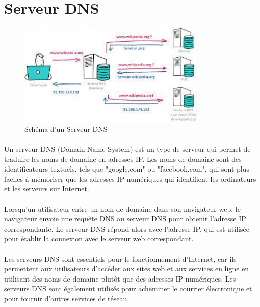  \section{Serveur DNS}
	\begin{figure}[h]
		\begin{center}
			
		
	\includegraphics[width=0.8\textwidth]{PhotoMemoire/serveur_dns.jpeg}
	\caption{Schéma d'un Serveur DNS}
\end{center}
\end{figure}
\paragraph{ }
Un serveur DNS (Domain Name System) est un type de serveur qui permet de traduire les noms de domaine en adresses IP. Les noms de domaine sont des identificateurs textuels, tels que "google.com" ou "facebook.com", qui sont plus faciles à mémoriser que les adresses IP numériques qui identifient les ordinateurs et les serveurs sur Internet.
\paragraph{ }
Lorsqu'un utilisateur entre un nom de domaine dans son navigateur web, le navigateur envoie une requête DNS au serveur DNS pour obtenir l'adresse IP correspondante. Le serveur DNS répond alors avec l'adresse IP, qui est utilisée pour établir la connexion avec le serveur web correspondant.
\paragraph{ }
Les serveurs DNS sont essentiels pour le fonctionnement d'Internet, car ils permettent aux utilisateurs d'accéder aux sites web et aux services en ligne en utilisant des noms de domaine plutôt que des adresses IP numériques. Les serveurs DNS sont également utilisés pour acheminer le courrier électronique et pour fournir d'autres services de réseau.

